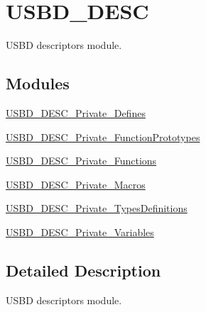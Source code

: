 \hypertarget{group___u_s_b_d___d_e_s_c}{}\section{U\+S\+B\+D\+\_\+\+D\+E\+SC}
\label{group___u_s_b_d___d_e_s_c}


U\+S\+BD descriptors module.  


\subsection*{Modules}
\begin{DoxyCompactItemize}
\item 
\mbox{\hyperlink{group___u_s_b_d___d_e_s_c___private___defines}{U\+S\+B\+D\+\_\+\+D\+E\+S\+C\+\_\+\+Private\+\_\+\+Defines}}
\item 
\mbox{\hyperlink{group___u_s_b_d___d_e_s_c___private___function_prototypes}{U\+S\+B\+D\+\_\+\+D\+E\+S\+C\+\_\+\+Private\+\_\+\+Function\+Prototypes}}
\item 
\mbox{\hyperlink{group___u_s_b_d___d_e_s_c___private___functions}{U\+S\+B\+D\+\_\+\+D\+E\+S\+C\+\_\+\+Private\+\_\+\+Functions}}
\item 
\mbox{\hyperlink{group___u_s_b_d___d_e_s_c___private___macros}{U\+S\+B\+D\+\_\+\+D\+E\+S\+C\+\_\+\+Private\+\_\+\+Macros}}
\item 
\mbox{\hyperlink{group___u_s_b_d___d_e_s_c___private___types_definitions}{U\+S\+B\+D\+\_\+\+D\+E\+S\+C\+\_\+\+Private\+\_\+\+Types\+Definitions}}
\item 
\mbox{\hyperlink{group___u_s_b_d___d_e_s_c___private___variables}{U\+S\+B\+D\+\_\+\+D\+E\+S\+C\+\_\+\+Private\+\_\+\+Variables}}
\end{DoxyCompactItemize}


\subsection{Detailed Description}
U\+S\+BD descriptors module. 


